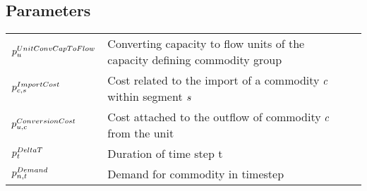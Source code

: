 \subsection*{Parameters}
\vspace{-1em}
	\begin{longtable}{p{\cola} p{\colc} >{\small\raggedleft\arraybackslash\itshape}p{\colb}}

		$p^{UnitConvCapToFlow}_{u}$	& Converting capacity to flow units of the capacity defining commodity group	&                \\[0.5em]

		$p^{ImportCost}_{c,s}   $	& Cost related to the import of a commodity $c$ within segment $s$ 	&                \\[0.5em]

		$p^{ConversionCost}_{u,c}$	& Cost attached to the outflow of commodity $c$ from the unit	&                \\[0.5em]

		$p^{DeltaT}_{t}       $	& Duration of time step t                                     	&                \\[0.5em]

		$p^{Demand}_{n,t}       $	& Demand for commodity \commodity in timestep \timestep       	&                \\[0.5em]


\end{longtable}
